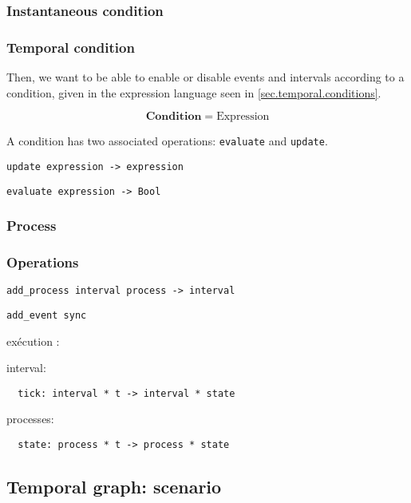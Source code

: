 \documentclass[a4paper]{article}
\begin{document}
\subsubsection{Instantaneous condition}
\subsubsection{Temporal condition}
Then, we want to be able to enable or disable events and intervals according to a condition, given in the expression language seen in \ref{sec.temporal.conditions}.

\[
\mathbf{Condition} = \mathrm{Expression}
\]

A condition has two associated operations: \texttt{evaluate} and \texttt{update}.

\begin{lstlisting}
update expression -> expression
\end{lstlisting}

\begin{lstlisting}
evaluate expression -> Bool
\end{lstlisting}


\subsubsection{Process}

\subsubsection{Operations}
\begin{lstlisting}
add_process interval process -> interval
\end{lstlisting}

\begin{lstlisting}
add_event sync
\end{lstlisting}

exécution : 

interval: 
\begin{lstlisting}
  tick: interval * t -> interval * state
  \end{lstlisting}

processes:
\begin{lstlisting}
  state: process * t -> process * state
  \end{lstlisting}

\subsection{Temporal graph: scenario}
\end{document}
